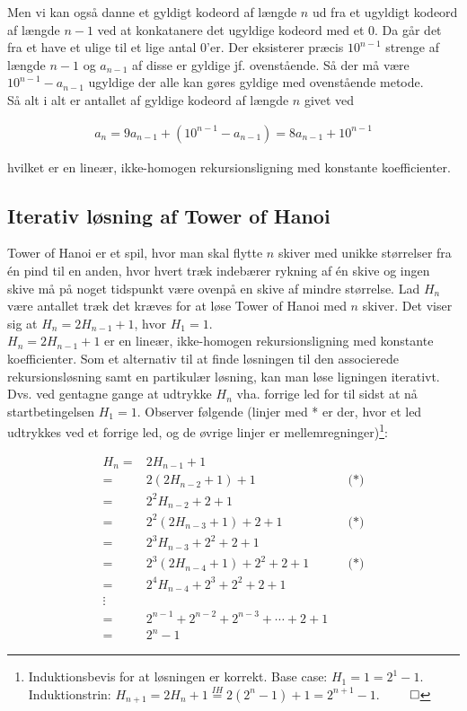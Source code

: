 \documentclass[12pt]{article}
\begin{document}
Men vi kan også danne et gyldigt kodeord af længde $n$ ud fra et ugyldigt kodeord af længde $n-1$ ved at konkatanere det ugyldige kodeord med et $0$. Da går det fra et have et ulige til et lige antal $0$'er. Der eksisterer præcis $10^{n-1}$ strenge af længde $n-1$ og $a_{n-1}$ af disse er gyldige jf. ovenstående. Så der må være $10^{n-1}-a_{n-1}$ ugyldige der alle kan gøres gyldige med ovenstående metode. \\

Så alt i alt er antallet af gyldige kodeord af længde $n$ givet ved 

\begin{align*}
    a_n=9 a_{n-1} + (10^{n-1}-a_{n-1}) = 8 a_{n-1} + 10^{n-1}
\end{align*}

hvilket er en lineær, ikke-homogen rekursionsligning med konstante koefficienter. 

\subsection*{Iterativ løsning af Tower of Hanoi}

Tower of Hanoi er et spil, hvor man skal flytte $n$ skiver med unikke størrelser fra én pind til en anden, hvor hvert træk indebærer rykning af én skive og ingen skive må på noget tidspunkt være ovenpå en skive af mindre størrelse. Lad $H_n$ være antallet træk det kræves for at løse Tower of Hanoi med $n$ skiver. Det viser sig at $H_n=2H_{n-1}+1$, hvor $H_1=1$. \\

$H_n=2H_{n-1}+1$ er en lineær, ikke-homogen rekursionsligning med konstante koefficienter. Som et alternativ til at finde løsningen til den associerede rekursionsløsning samt en partikulær løsning, kan man løse ligningen iterativt. Dvs. ved gentagne gange at udtrykke $H_n$ vha. forrige led for til sidst at nå startbetingelsen $H_1=1$. Observer følgende (linjer med * er der, hvor et led udtrykkes ved et forrige led, og de øvrige linjer er mellemregninger)\footnote{Induktionsbevis for at løsningen er korrekt. Base case: $H_1=1=2^1-1$. Induktionstrin: $H_{n+1}=2H_n+1 \stackrel{IH}{=}2(2^n-1)+1=2^{n+1}-1$. $\qed$}: 

\begin{align*}
    H_n =& 2H_{n-1}+1 \\
    =& 2(2H_{n-2}+1)+1 && \text{(*)} \\
    =& 2^2 H_{n-2} +2+1 \\
    =& 2^2(2H_{n-3} +1)+2+1 && \text{(*)}\\
    =& 2^3 H_{n-3} + 2^2 + 2 +1 \\
    =& 2^3(2H_{n-4}+1)+2^2+2+1 && \text{(*)} \\
    =& 2^4 H_{n-4} +2^3 + 2^2 +2+1 \\
    \vdots & \\
    =& 2^{n-1} + 2^{n-2} + 2^{n-3} + \cdots + 2+1 \\
    =& 2^n-1
\end{align*}
\end{document}
